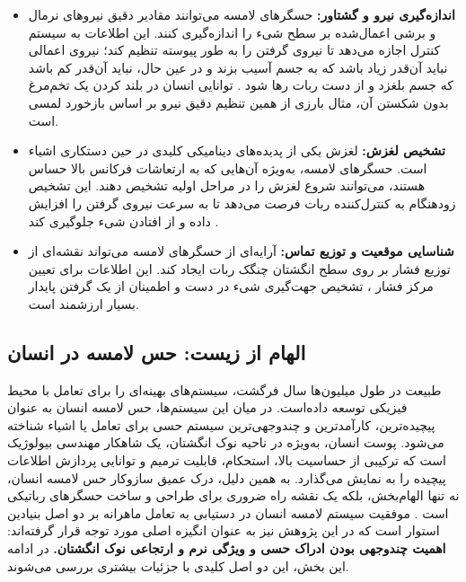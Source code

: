  \begin{itemize}
 	\item \textbf{اندازه‌گیری نیرو و گشتاور:} 
حسگرهای لامسه می‌توانند مقادیر دقیق نیروهای نرمال و برشی اعمال‌شده بر سطح شیء را اندازه‌گیری کنند. این اطلاعات به سیستم کنترل اجازه می‌دهد تا نیروی گرفتن را به طور پیوسته تنظیم کند؛ نیروی اعمالی نباید آن‌قدر زیاد باشد که به جسم آسیب بزند و در عین حال، نباید آن‌قدر کم باشد که جسم بلغزد و از دست ربات رها شود
 	\cite{piga2023adaptive}
 	. توانایی انسان در بلند کردن یک تخم‌مرغ بدون شکستن آن، مثال بارزی از همین تنظیم دقیق نیرو بر اساس بازخورد لمسی است.
 	 
 	 \item \textbf{تشخیص لغزش:} 
لغزش یکی از پدیده‌های دینامیکی کلیدی در حین دستکاری اشیاء است. حسگرهای لامسه، به‌ویژه آن‌هایی که به ارتعاشات فرکانس بالا حساس هستند، می‌توانند شروع لغزش را در مراحل اولیه تشخیص دهند. این تشخیص زودهنگام به کنترل‌کننده ربات فرصت می‌دهد تا به سرعت نیروی گرفتن را افزایش داده و از افتادن شیء جلوگیری کند
 	 \cite{kyberd2023slip,costanzo2018slipping}.
 	 
 	 \item \textbf{شناسایی موقعیت و توزیع تماس:}
آرایه‌ای از حسگرهای لامسه می‌تواند نقشه‌ای از توزیع فشار بر روی سطح انگشتان چنگک ربات ایجاد کند. این اطلاعات برای تعیین مرکز فشار
\cite{de2022soft}
، تشخیص جهت‌گیری شیء در دست
\cite{wang_low-cost_2016}
 و اطمینان از یک گرفتن پایدار
 \cite{khamis_novel_2019}
  بسیار ارزشمند است.
 \end{itemize} 
\subsection{الهام از زیست: حس لامسه در انسان}
طبیعت در طول میلیون‌ها سال فرگشت، سیستم‌های بهینه‌ای را برای تعامل با محیط فیزیکی توسعه داده‌است. در میان این سیستم‌ها، حس لامسه انسان به عنوان پیچیده‌ترین، کارآمدترین و چندوجهی‌ترین سیستم حسی برای تعامل یا اشیاء شناخته می‌شود. پوست انسان، به‌ویژه در ناحیه نوک انگشتان، یک شاهکار مهندسی بیولوژیک است که ترکیبی از حساسیت بالا، استحکام، قابلیت ترمیم و توانایی پردازش اطلاعات پیچیده را به نمایش می‌گذارد. به همین دلیل، درک عمیق سازوکار حس لامسه انسان، نه تنها الهام‌بخش، بلکه یک نقشه راه ضروری برای طراحی و ساخت  حسگرهای رباتیکی است
\cite{silvera2015artificial}.
موفقیت سیستم لامسه انسان در دستیابی به تعامل ماهرانه
  بر دو اصل بنیادین استوار است که در این پژوهش نیز به عنوان انگیزه اصلی مورد توجه قرار گرفته‌اند: 
 \textbf{اهمیت چندوجهی بودن ادراک حسی و ویژگی نرم و ارتجاعی نوک انگشتان.}
 در ادامه این بخش، این دو اصل کلیدی با جزئیات بیشتری بررسی می‌شوند.
